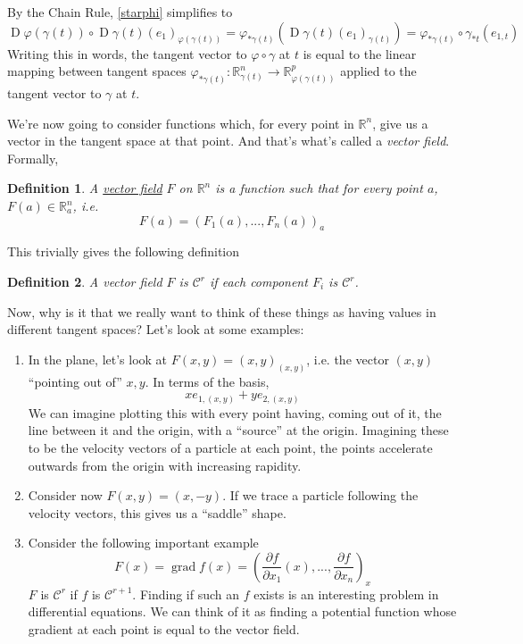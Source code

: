 \documentclass{article}
\newtheorem{definition}{Definition}
\DeclareMathOperator{\grad}{grad}
\DeclareMathOperator{\D}{D}
\newcommand{\reals}[0]{\mathbb{R}}
\newcommand{\mc}[1]{\mathcal{#1}}
\newcommand{\prt}[2]{\frac{\partial #1}{\partial #2}}
\begin{document}
By the Chain Rule, \ref{starphi} simplifies to
\begin{equation}
  \D\varphi(\gamma(t)) \circ \D\gamma(t) (e_1)_{\varphi(\gamma(t))} = \varphi_{*\gamma(t)}(\D\gamma(t)(e_1)_{\gamma(t)}) = \varphi_{*\gamma(t)} \circ \gamma_{*t}(e_{1, t})
\end{equation}
Writing this in words, the tangent vector to \(\varphi \circ \gamma\) at \(t\) is equal to the linear mapping between tangent spaces \(\varphi_{*\gamma(t)}: \reals^n_{\gamma(t)} \to \reals^p_{\varphi(\gamma(t))}\) applied to the tangent vector to \(\gamma\) at \(t\).

We're now going to consider functions which, for every point in \(\reals^n\), give us a vector in the tangent space at that point. And that's what's called a \textit{vector field}. Formally,
\begin{definition}
  A \underline{vector field} \(F\) on \(\reals^n\) is a function such that for every point \(a\), \(F(a) \in \reals^n_a\), i.e.
  \begin{equation}
    F(a) = (F_1(a),...,F_n(a))_a
  \end{equation}
\end{definition}
This trivially gives the following definition
\begin{definition}
  A vector field \(F\) is \(\mc{C}^r\) if each component \(F_i\) is \(\mc{C}^r\).
\end{definition}
Now, why is it that we really want to think of these things as having values in different tangent spaces? Let's look at some examples:
\begin{enumerate}

  \item In the plane, let's look at \(F(x, y) = (x, y)_{(x, y)}\), i.e. the vector \((x, y)\) ``pointing out of'' \(x, y\). In terms of the basis,
  \begin{equation}
    xe_{1, (x, y)} + ye_{2, (x, y)}
  \end{equation}
  We can imagine plotting this with every point having, coming out of it, the line between it and the origin, with a ``source'' at the origin. Imagining these to be the velocity vectors of a particle at each point, the points accelerate outwards from the origin with increasing rapidity.

  \item Consider now \(F(x, y) = (x, -y)\). If we trace a particle following the velocity vectors, this gives us a ``saddle'' shape.

  \item Consider the following important example
  \begin{equation}
    F(x) = \grad f(x) = \left(\prt{f}{x_1}(x),...,\prt{f}{x_n}\right)_x
  \end{equation}
  \(F\) is \(\mc{C}^r\) if \(f\) is \(\mc{C}^{r + 1}\). Finding if such an \(f\) exists is an interesting problem in differential equations. We can think of it as finding a potential function whose gradient at each point is equal to the vector field.

\end{enumerate}
\end{document}
